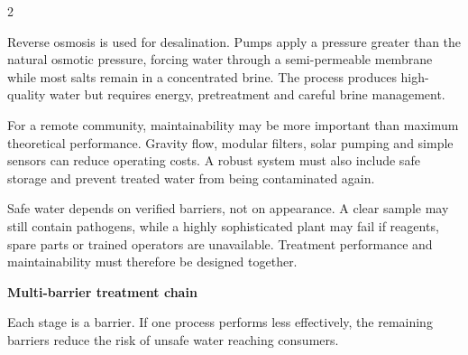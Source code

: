 \begin{multicols}{2}
\begin{ecarticle}
Reverse osmosis is used for desalination. Pumps apply a pressure greater than the natural osmotic
pressure, forcing water through a semi-permeable membrane while most salts remain in a concentrated
brine. The process produces high-quality water but requires energy, pretreatment and careful brine
management.

For a remote community, maintainability may be more important than maximum theoretical performance.
Gravity flow, modular filters, solar pumping and simple sensors can reduce operating costs. A robust
system must also include safe storage and prevent treated water from being contaminated again.
\end{ecarticle}

\begin{tcolorbox}[title=\sffamily\bfseries Engineering Insight,colback=yellow!10,colframe=ECOrange]
Safe water depends on verified barriers, not on appearance. A clear sample may still contain
pathogens, while a highly sophisticated plant may fail if reagents, spare parts or trained operators
are unavailable. Treatment performance and maintainability must therefore be designed together.
\end{tcolorbox}

\begin{engineeringfocus}
\textbf{Multi-barrier treatment chain}
\begin{center}
\end{center}
Each stage is a barrier. If one process performs less effectively, the remaining barriers reduce the
risk of unsafe water reaching consumers.
\end{engineeringfocus}


\end{multicols}
